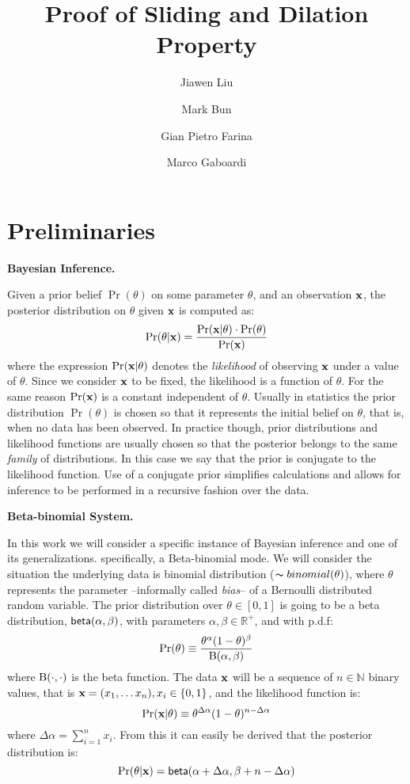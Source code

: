\documentclass{article}
\begin{document}
\title{Proof of Sliding and Dilation Property}

\author[*]{Jiawen Liu}
\author[**]{Mark Bun}
\author[*]{Gian Pietro Farina}
\author[*]{Marco Gaboardi}
\date{}
\maketitle



\section{Preliminaries}
\label{sec_background}

\noindent \textbf{Bayesian Inference.}

Given a prior belief $\Pr(\theta)$ on some parameter $\theta$,
and an observation $\textbf{x}$, the posterior distribution on $\theta$ given $\textbf{x}$ is computed as:
\[
  \Pr(\theta | \textbf{x}) = \frac{\Pr(\textbf{x} | \theta) \cdot \Pr(\theta)}{\Pr(\textbf{x})}
\]
where the expression $\Pr(\textbf{x} | \theta)$ denotes the
\emph{likelihood} of observing $\textbf{x}$ under a value of
$\theta$. Since we consider $\textbf{x}$ to be fixed, the likelihood is
a function of $\theta$.
For the same reason $\Pr(\textbf{x})$ is a constant independent of $\theta$.
Usually in statistics the prior distribution $\Pr(\theta)$ is chosen so that it represents
the initial belief on $\theta$, that is, when no data has been observed. In practice though,
prior distributions and likelihood functions are usually chosen so that the posterior
belongs to the same \emph{family} of distributions. In this case we say that the prior
is conjugate to the likelihood function. Use of a conjugate prior
simplifies calculations and allows for inference to be performed in a
recursive fashion over the data.


\noindent \textbf{Beta-binomial System.}

In this work we will consider a specific instance of Bayesian inference and one of its generalizations.
specifically, a Beta-binomial mode. We will consider the situation the underlying data is binomial distribution ($\thicksim binomial(\theta)$), where $\theta$ represents
the parameter --informally called \emph{bias}-- of a Bernoulli
distributed random variable. The
prior distribution over $\theta\in [0,1]$ is going to be a beta
distribution, $\mathsf{beta}(\alpha, \beta)$, with parameters
$\alpha,\beta\in\mathbb{R}^{+}$, and with p.d.f:
\[
  \Pr(\theta)\equiv \frac{\theta^{\alpha} (1- \theta)^{\beta}}{\textup{B}(\alpha,\beta)}
\]
where $\textup{B}(\cdot,\cdot)$ is the beta function.
The data $\textbf{x}$ will be a sequence of $n\in\mathbb{N}$ binary values, that is $\textbf{x}= (x_1,\dots x_n), x_i\in\{0,1\}$, and the likelihood function is:
\[
  \Pr(\textbf{x} | \theta)\equiv \theta^{\Delta \alpha}(1-\theta)^{n - \Delta \alpha}
\]
where $\Delta \alpha = \displaystyle\sum_{i=1}^{n}x_i$.
From this it can easily be derived that the posterior distribution is:
\[
  \Pr(\theta|\textbf{x})=\mathsf{beta}(\alpha + \Delta \alpha,\beta + n - \Delta \alpha)
\]
\end{document}
